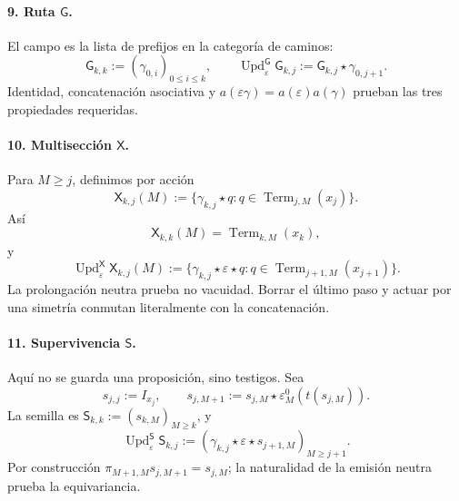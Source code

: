 \paragraph{9. Ruta \(\mathsf G\).}
El campo es la lista de prefijos en la categoría de caminos:
\begin{equation}
\label{rm:eq:pdfv2-terminal-update-g}
 \mathsf G_{k,k}:=(\gamma_{0,i})_{0\leq i\leq k},\qquad
 \operatorname{Upd}^{\mathsf G}_{\varepsilon}\mathsf G_{k,j}
 :=\mathsf G_{k,j}\star\gamma_{0,j+1}.
\end{equation}
Identidad, concatenación asociativa y
\(a(\varepsilon\gamma)=a(\varepsilon)a(\gamma)\) prueban las tres
propiedades requeridas.

\paragraph{10. Multisección \(\mathsf X\).}
Para \(M\geq j\), definimos por acción
\begin{equation}
\label{rm:eq:pdfv2-terminal-multiseccion-interna}
 \mathsf X_{k,j}(M):=
 \{\gamma_{k,j}\star q:
 q\in\operatorname{Term}_{j,M}(x_j)\}.
\end{equation}
Así
\[
 \mathsf X_{k,k}(M)=\operatorname{Term}_{k,M}(x_k),
\]
y
\begin{equation}
\label{rm:eq:pdfv2-terminal-update-x}
 \operatorname{Upd}^{\mathsf X}_{\varepsilon}\mathsf X_{k,j}(M)
 :=
 \{\gamma_{k,j}\star\varepsilon\star q:
 q\in\operatorname{Term}_{j+1,M}(x_{j+1})\}.
\end{equation}
La prolongación neutra prueba no vacuidad. Borrar el último paso y actuar
por una simetría conmutan literalmente con la concatenación.

\paragraph{11. Supervivencia \(\mathsf S\).}
Aquí no se guarda una proposición, sino testigos. Sea
\begin{equation}
\label{rm:eq:pdfv2-terminal-testigo-neutro}
 s_{j,j}:=I_{x_j},\qquad
 s_{j,M+1}:=s_{j,M}\star
 \varepsilon_M^0(t(s_{j,M})).
\end{equation}
La semilla es
\(\mathsf S_{k,k}:=(s_{k,M})_{M\geq k}\), y
\begin{equation}
\label{rm:eq:pdfv2-terminal-update-s}
 \operatorname{Upd}^{\mathsf S}_{\varepsilon}\mathsf S_{k,j}
 :=(\gamma_{k,j}\star\varepsilon\star s_{j+1,M})_{M\geq j+1}.
\end{equation}
Por construcción
\(\pi_{M+1,M}s_{j,M+1}=s_{j,M}\); la naturalidad de la emisión neutra
prueba la equivariancia.

